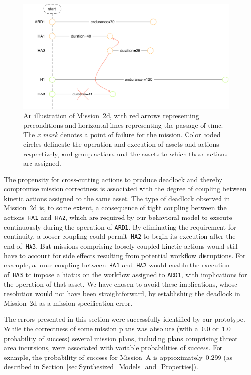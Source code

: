 \begin{figure}[ht]
\centering
\includegraphics[scale=0.58]{img/mission-2d.pdf}
\caption[Mission 2d]{An illustration of Mission~2d, with red arrows representing preconditions and horizontal lines representing the passage of time. The \emph{x mark} denotes a point of failure for the mission. Color coded circles delineate the operation and execution of assets and actions, respectively, and group actions and the assets to which those actions are assigned.}
\label{fig:mission_2d}
\end{figure}

The propensity for cross-cutting actions to produce deadlock and thereby compromise mission correctness is associated with the degree of coupling between kinetic actions assigned to the same asset. The type of deadlock observed in Mission~2d is, to some extent, a consequence of tight coupling between the actions~\texttt{HA1} and~\texttt{HA2}, which are required by our behavioral model to execute continuously during the operation of \texttt{ARD1}. By eliminating the requirement for continuity, a looser coupling could permit~\texttt{HA2} to begin its execution after the end of~\texttt{HA3}. But missions comprising loosely coupled kinetic actions would still have to account for side effects resulting from potential workflow disruptions. For example, a loose coupling between~\texttt{HA1} and~\texttt{HA2} would enable the execution of~\texttt{HA3} to impose a hiatus on the workflow assigned to \texttt{ARD1}, with implications for the operation of that asset. We have chosen to avoid these implications, whose resolution would not have been straightforward, by establishing the deadlock in Mission~2d as a mission specification error.

The errors presented in this section were successfully identified by our prototype. While the correctness of some mission plans was absolute (with a~0.0 or~1.0 probability of success) several mission plans, including plans comprising threat area incursions, were associated with variable probabilities of success. For example, the probability of success for Mission~A is approximately~0.299 (as described in Section~\ref{sec:Synthesized_Models_and_Properties}).

